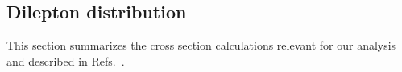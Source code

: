 \subsection{Dilepton distribution}
\label{ssec:DYxsec}
%
%
This section summarizes the cross section calculations relevant
for our analysis and described in Refs.~\cite{Kostelecky:2019fse,lssv21}.
%
%

